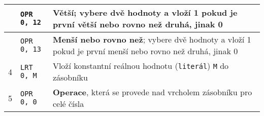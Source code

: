 \documentclass[
12pt,
a4paper,
pdftex,
czech
]{report}
\begin{document}
\begin{longtable}{|c|l|p{10cm}|}
\rule{0pt}{3ex} & \texttt{OPR 0, 12} & \textbf{Větší}; vybere dvě hodnoty a vloží 1 pokud je první větší nebo rovno než druhá, jinak 0 \\ \hline
\rule{0pt}{3ex} & \texttt{OPR 0, 13} & \textbf{Menší nebo rovno než}; vybere dvě hodnoty a vloží 1 pokud je první menší nebo rovno než druhá, jinak 0 \\ \hline
\rule{0pt}{3ex}4 & \texttt{LRT 0, M} & Vloží konstantní reálnou hodnotu (\texttt{literál}) \texttt{M} do zásobníku \\ \hline
\rule{0pt}{3ex}5 & \texttt{OPR 0, 0} & \textbf{Operace}, která se provede nad vrcholem zásobníku pro celé čísla \\ \hline
\end{longtable}
\end{document}

